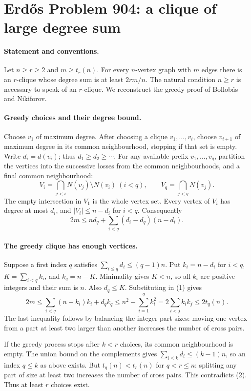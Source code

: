 \section*{Erd\H{o}s Problem 904: a clique of large degree sum}

\paragraph{Statement and conventions.}
Let \(n\geq r\geq2\) and \(m\geq t_r(n)\).
For every \(n\)-vertex graph with \(m\) edges there is an
\(r\)-clique whose degree sum is at least \(2rm/n\).
The natural condition \(n\geq r\) is necessary to speak
of an \(r\)-clique. We reconstruct the greedy proof of
Bollob\'as and Nikiforov.

\paragraph{Greedy choices and their degree bound.}
Choose \(v_1\) of maximum degree. After choosing a clique
\(v_1,\ldots,v_i\), choose \(v_{i+1}\) of maximum degree
in its common neighbourhood, stopping if that set is empty.
Write \(d_i=d(v_i)\); thus \(d_1\geq d_2\geq\cdots\).
For any available prefix \(v_1,\ldots,v_q\), partition
the vertices into the successive losses from the common
neighbourhoods, and a final common neighbourhood:
\[
 V_i=\bigcap_{j<i}N(v_j)\setminus N(v_i)\ (i<q),
 \qquad V_q=\bigcap_{j<q}N(v_j).
\]
The empty intersection in \(V_1\) is the whole vertex set.
Every vertex of \(V_i\) has degree at most \(d_i\), and
\(|V_i|\leq n-d_i\) for \(i<q\). Consequently
\[
 2m\leq nd_q+\sum_{i<q}(d_i-d_q)(n-d_i).
\tag{1}
\]

\paragraph{The greedy clique has enough vertices.}
Suppose a first index \(q\) satisfies
\(\sum_{i\leq q}d_i\leq(q-1)n\).
Put \(k_i=n-d_i\) for \(i<q\), \(K=\sum_{i<q}k_i\),
and \(k_q=n-K\). Minimality gives \(K<n\), so all \(k_i\)
are positive integers and their sum is \(n\).
Also \(d_q\leq K\). Substituting in (1) gives
\[
 2m\leq\sum_{i<q}(n-k_i)k_i+d_qk_q
 \leq n^2-\sum_{i=1}^q k_i^2
 =2\sum_{i<j}k_ik_j\leq2t_q(n).
\tag{2}
\]
The last inequality follows by balancing the integer
part sizes: moving one vertex from a part at least two
larger than another increases the number of cross pairs.

If the greedy process stops after \(k<r\) choices, its
common neighbourhood is empty. The union bound on the
complements gives
\(\sum_{i\leq k}d_i\leq(k-1)n\), so an index \(q\leq k\)
as above exists. But \(t_q(n)<t_r(n)\) for \(q<r\leq n\):
splitting any part of size at least two increases the
number of cross pairs. This contradicts (2).
Thus at least \(r\) choices exist.

